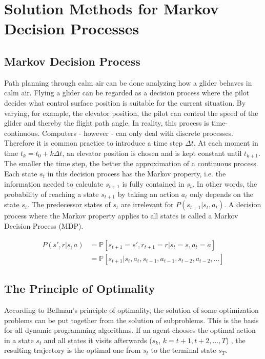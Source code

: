 \chapter{Solution Methods for Markov Decision Processes}
\label{chapter2}

\section{Markov Decision Process}

Path planning through calm air can be done analyzing how a glider behaves in calm air. Flying a glider can be regarded as a decision process where the pilot decides what control surface position is suitable for the current situation. By varying, for example, the elevator position, the pilot can control the speed of the glider and thereby the flight path angle. In reality, this process is time-continuous. Computers - however - can only deal with discrete processes. Therefore it is common practice to introduce a time step $\Delta t$. At each moment in time $t_k = t_0 + k\Delta t$, an elevator position is chosen and is kept constant until $t_{k+1}$. The smaller the time step, the better the approximation of a continuous process. Each state $s_t$ in this decision process has the Markov property, i.e. the information needed to calculate $s_{t+1}$ is fully contained in $s_t$. In other words, the probability of reaching a state $s_{t+1}$ by taking an action $a_t$ only depends on the state $s_t$. The predecessor states of $s_t$ are irrelevant for $P(s_{t+1}|s_t,a_t)$. A decision process where the Markov property applies to all states is called a Markov Decision Process (MDP). 

\begin{align}
P(s',r|s,a)&=\mathbb{P}[s_{t+1}=s',r_{t+1}=r|s_t=s,a_t=a] \\
&= \mathbb{P}[s_{t+1}|s_t,a_t,s_{t-1},a_{t-1},s_{t-2},a_{t-2},...]
\end{align}

\section{The Principle of Optimality}
\label{sec:optimality}

According to Bellman's principle of optimality, the solution of some optimization problems can be put together from the solution of subproblems. This is the basis for all dynamic programming algorithms. If an agent chooses the optimal action in a state $s_t$ and all states it visits afterwards ($s_k$, $k=t+1, t+2, ...,T$) , the resulting trajectory is the optimal one from $s_t$ to the terminal state $s_T$.

